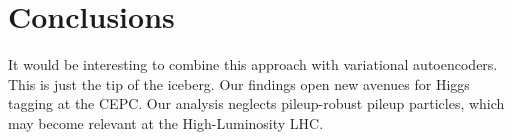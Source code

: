 \section{Conclusions}\label{sec:conclusions}

It would be interesting to combine this approach with variational
autoencoders. This is just the tip of the iceberg. Our findings open new
avenues for Higgs tagging at the CEPC. Our analysis neglects
pileup-robust pileup particles, which may become relevant at the
High-Luminosity LHC.

